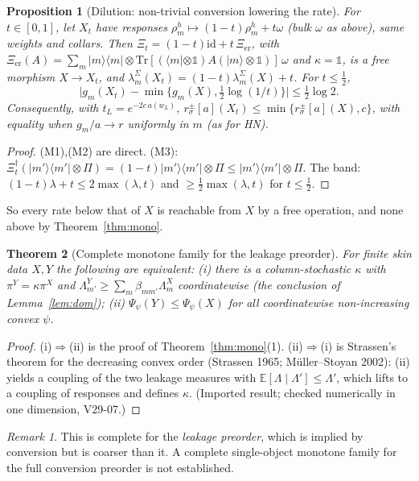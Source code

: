 \documentclass[11pt]{article}
\newtheorem{theorem}{Theorem}
\newtheorem{proposition}[theorem]{Proposition}
\theoremstyle{definition}
\theoremstyle{remark}
\newtheorem{remark}{Remark}
\newcommand{\Tr}{\mathrm{Tr}}
\newcommand{\E}{\mathbb{E}}
\newcommand{\one}{\mathbb{1}}
\begin{document}
\begin{proposition}[Dilution: non-trivial conversion lowering the rate]\label{prop:dil}
For $t\in[0,1]$, let $X_t$ have responses $\rho^h_m\mapsto(1-t)\rho^h_m+t\omega$ (bulk $\omega$ as above), same weights and collars. Then $\Xi_t=(1-t)\mathrm{id}+t\,\Xi_{\mathrm{er}}$, with $\Xi_{\mathrm{er}}(A)=\sum_m|m\rangle\!\langle m|\otimes\Tr[(\langle m|\otimes\one)A(|m\rangle\otimes\one)]\,\omega$ and $\kappa=\mathbb 1$, is a free morphism $X\to X_t$, and $\lambda^\Sigma_m(X_t)=(1-t)\lambda^\Sigma_m(X)+t$. For $t\le\tfrac12$,
\[
\bigl|g_m(X_t)-\min\{g_m(X),\tfrac12\log(1/t)\}\bigr|\le\tfrac12\log2.
\]
Consequently, with $t_L=e^{-2c\,a(w_L)}$, $r^\pm_\sigma[a](X_t)\le\min\{r^\pm_\sigma[a](X),c\}$, with equality when $g_m/a\to r$ uniformly in $m$ (as for HN).
\end{proposition}
\begin{proof}
(M1),(M2) are direct. (M3): $\Xi_t^\dagger(|m'\rangle\!\langle m'|\otimes\Pi)=(1-t)|m'\rangle\!\langle m'|\otimes\Pi\le|m'\rangle\!\langle m'|\otimes\Pi$. The band: $(1-t)\lambda+t\le2\max(\lambda,t)$ and $\ge\tfrac12\max(\lambda,t)$ for $t\le\tfrac12$.
\end{proof}
\noindent So every rate below that of $X$ is reachable from $X$ by a free operation, and none above by Theorem~\ref{thm:mono}.

\begin{theorem}[Complete monotone family for the leakage preorder]\label{thm:strassen}
For finite skin data $X,Y$ the following are equivalent:
(i) there is a column-stochastic $\kappa$ with $\pi^Y=\kappa\pi^X$ and $\Lambda^Y_{m'}\ge\sum_m\beta_{mm'}\Lambda^X_m$ coordinatewise (the conclusion of Lemma~\ref{lem:dom});
(ii) $\Psi_\psi(Y)\le\Psi_\psi(X)$ for all coordinatewise non-increasing convex $\psi$.
\end{theorem}
\begin{proof}
(i)$\Rightarrow$(ii) is the proof of Theorem~\ref{thm:mono}(1). (ii)$\Rightarrow$(i) is Strassen's theorem for the decreasing convex order (Strassen 1965; M\"uller--Stoyan 2002): (ii) yields a coupling of the two leakage measures with $\E[\Lambda\mid\Lambda']\le\Lambda'$, which lifts to a coupling of responses and defines $\kappa$. (Imported result; checked numerically in one dimension, V29-07.)
\end{proof}
\begin{remark}
This is complete for the \emph{leakage preorder}, which is implied by conversion but is coarser than it. A complete single-object monotone family for the full conversion preorder is not established.
\end{remark}
\end{document}
